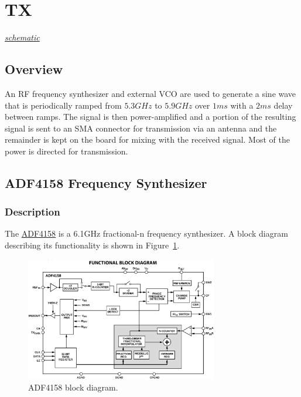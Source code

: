 \section{TX}
\label{sec:tx}
\textit{\hyperlink{schematic.5}{schematic}}

\subsection{Overview}
\label{sec:tx-overview}

An RF frequency synthesizer and external VCO are used to generate a sine wave that is periodically
ramped from $5.3 \si{GHz}$ to $5.9 \si{GHz}$ over $1 \si{ms}$ with a $2 \si{ms}$ delay between
ramps. The signal is then power-amplified and a portion of the resulting signal is sent to an SMA
connector for transmission via an antenna and the remainder is kept on the board for mixing with the
received signal. Most of the power is directed for transmission.

\subsection{ADF4158 Frequency Synthesizer}
\label{sec:adf4158}

\subsubsection{Description}
\label{sec:adf4158-description}

The \href{http://www.analog.com/media/en/technical-documentation/data-sheets/ADF4158.pdf}{ADF4158}
is a 6.1GHz fractional-n frequency synthesizer. A block diagram describing its functionality is shown in
Figure~\ref{fig:adf4158-block-diagram}.

\begin{figure}[h]
        \centering
        \includegraphics[width=0.75\textwidth]{data/adf4158-block-diagram.png}
        \caption{ADF4158 block diagram.}
        \label{fig:adf4158-block-diagram}
\end{figure}

